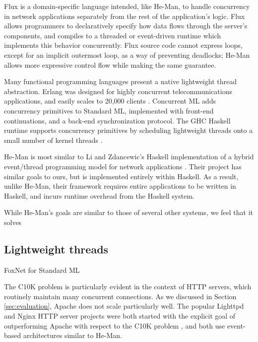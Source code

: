 \documentclass[preprint]{sigplanconf}
\begin{document}
Flux \cite{BurnsEtAl} is a domain-specific language intended, like He-Man, to
handle concurrency in network applications separately from the rest of the
application's logic. Flux allows programmers to declaratively specify how data
flows through the server's components, and compiles to a threaded or
event-driven runtime which implements this behavior concurrently. Flux source
code cannot express loops, except for an implicit outermost loop, as a way of
preventing deadlocks; He-Man allows more expressive control flow while making
the same guarantee.

Many functional programming languages present a native lightweight thread
abstraction. Erlang \cite{VirdingEtAl} was designed for highly concurrent
telecommunications applications, and easily scales to 20,000 clients
\cite{Hellstrom}. Concurrent ML \cite{ReppyEtAl} adds concurrency primitives to
Standard ML, implemented with front-end continuations, and a back-end
synchronization protocol. The GHC Haskell runtime supports concurrency
primitives \cite{LiEtAl} by scheduling lightweight threads onto a small number
of kernel threads \cite{MarlowEtAl}.


He-Man is most similar to Li and Zdancewic's Haskell implementation of
a hybrid event/thread programming model for network applications
\cite{LiZdancewic}.  Their project has similar goals to ours, but is
implemented entirely within Haskell. As a result, unlike He-Man, their
framework requires entire applications to be written in Haskell, and
incurs runtime overhead from the Haskell system.

While He-Man's goals are similar to
those of several other systems, we feel that it solves 

\subsection{Lightweight threads}



\cite{Vinoski}
\cite{Hellstrom}
FoxNet for Standard ML \cite{BiagioniEtAl}
\cite{GraunkeEtAl}
\cite{Queinnec}

The C10K problem is particularly evident in the context of HTTP
servers, which routinely maintain many concurrent connections. As we
discussed in Section \ref{sec:evaluation}, Apache does not scale
particularly well. The popular Lighttpd and Nginx HTTP server projects
were both started with the explicit goal of outperforming Apache with
respect to the C10K problem \cite{Lighttpd,Nginx}, and both use
event-based architectures similar to He-Man.
\end{document}
